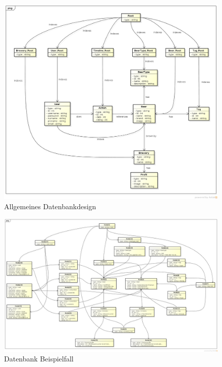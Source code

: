 \documentclass[10pt,a4paper]{scrartcl}
\begin{document}
\begin{figure}[H]
	\includegraphics[height=\textwidth,angle=90]{Database_Design_Graph.png}
	\caption{Allgemeines Datenbankdesign}
	\label{fig:database_design}
\end{figure}

\begin{figure}[H]
	\includegraphics[height=\textwidth,angle=90]{Database_Example.png}
	\caption{Datenbank Beispielfall}
	\label{fig:database_design_example}
\end{figure}
\end{document}
